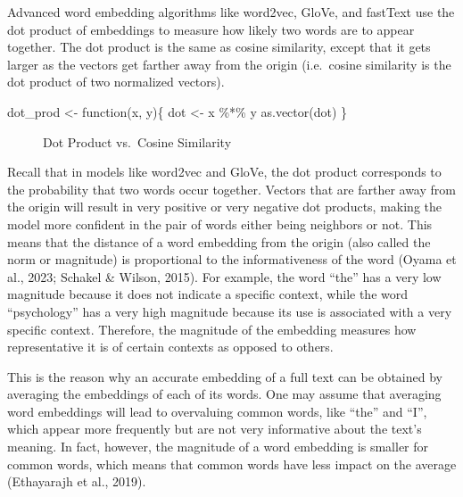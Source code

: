 \documentclass[
  man,
  floatsintext,
  longtable,
  nolmodern,
  notxfonts,
  notimes,
  colorlinks=true,linkcolor=blue,citecolor=blue,urlcolor=blue]{apa7}
\newenvironment{Shaded}{\begin{snugshade}}{\end{snugshade}}
\newcommand{\ControlFlowTok}[1]{\textcolor[rgb]{0.00,0.23,0.31}{#1}}
\newcommand{\FunctionTok}[1]{\textcolor[rgb]{0.28,0.35,0.67}{#1}}
\newcommand{\NormalTok}[1]{\textcolor[rgb]{0.00,0.23,0.31}{#1}}
\newcommand{\OtherTok}[1]{\textcolor[rgb]{0.00,0.23,0.31}{#1}}
\newcommand{\SpecialCharTok}[1]{\textcolor[rgb]{0.37,0.37,0.37}{#1}}
\begin{document}
Advanced word embedding algorithms like word2vec, GloVe, and fastText
use the dot product of embeddings to measure how likely two words are to
appear together. The dot product is the same as cosine similarity,
except that it gets larger as the vectors get farther away from the
origin (i.e.~cosine similarity is the dot product of two normalized
vectors).

\begin{Shaded}
\begin{Highlighting}[]
\NormalTok{dot\_prod }\OtherTok{\textless{}{-}} \ControlFlowTok{function}\NormalTok{(x, y)\{}
\NormalTok{  dot }\OtherTok{\textless{}{-}}\NormalTok{ x }\SpecialCharTok{\%*\%}\NormalTok{ y}
  \FunctionTok{as.vector}\NormalTok{(dot)}
\NormalTok{\}}
\end{Highlighting}
\end{Shaded}

\begin{figure}

\caption{\label{fig-dotprod}Dot Product vs.~Cosine Similarity}


\end{figure}%

Recall that in models like word2vec and GloVe, the dot product
corresponds to the probability that two words occur together. Vectors
that are farther away from the origin will result in very positive or
very negative dot products, making the model more confident in the pair
of words either being neighbors or not. This means that the distance of
a word embedding from the origin (also called the norm or magnitude) is
proportional to the informativeness of the word (Oyama et al., 2023;
Schakel \& Wilson, 2015). For example, the word ``the'' has a very low
magnitude because it does not indicate a specific context, while the
word ``psychology'' has a very high magnitude because its use is
associated with a very specific context. Therefore, the magnitude of the
embedding measures how representative it is of certain contexts as
opposed to others.

This is the reason why an accurate embedding of a full text can be
obtained by averaging the embeddings of each of its words. One may
assume that averaging word embeddings will lead to overvaluing common
words, like ``the'' and ``I'', which appear more frequently but are not
very informative about the text's meaning. In fact, however, the
magnitude of a word embedding is smaller for common words, which means
that common words have less impact on the average (Ethayarajh et al.,
2019).
\end{document}
